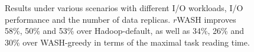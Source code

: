 \documentclass[conference]{IEEEtran}
\begin{document}
\begin{figure}[!t]
	\centering
	\quad\quad %
	\quad\quad
	\vspace{-1ex}
	\caption{Results under various scenarios with different I/O workloads, I/O performance and the number of data replicas. $r$WASH improves 58\%, 50\% and 53\% over Hadoop-default, as well as 34\%, 26\% and 30\% over WASH-greedy in terms of the maximal task reading time.}
	\label{Fig:complete}
\end{figure}

\end{document}
